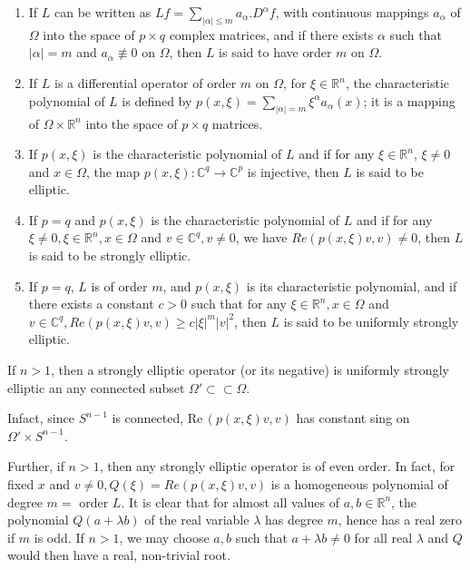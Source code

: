 \begin{defi*} %
  \begin{enumerate} [ (1)]
  \item If $L$ can be written as $Lf = \sum\limits_{| \alpha | \le m}
    a_\alpha . D^\alpha f$, with continuous mappings $a_\alpha$ of
    $\Omega$ into the space of $p \times q$ complex matrices, and if
    there exists $\alpha$ such that $| \alpha | = m$ and $a_\alpha
    \nequiv 0$ on $\Omega$, then $L$ is said to have order $m$ on
    $\Omega$. 
  \item If $L$ is a differential operator of order $m$ on $\Omega$,
    for $\xi \in \mathbb{R}^n$, the characteristic polynomial of $L$ is
    defined by $p (x, \xi) = \sum\limits_{| \alpha | =m} \xi^\alpha
    a_\alpha (x)$; it is a mapping of $\Omega \times \mathbb{R}^n$
    into the space of $p \times q $ matrices. 
  \item If $p (x, \xi)$ is the characteristic polynomial of $L$ and if
    for any $\xi \in \mathbb{R}^n$, $\xi \neq 0$ and $x \in \Omega$,
    the  map $p(x, \xi) : \mathbb{C}^q \to \mathbb{C}^p$ is injective,
    then $L$ is said to be elliptic. 
  \item If $p = q$ and $p(x, \xi)$ is the characteristic polynomial of
    $L$ and if for any $\xi \neq 0, \xi \in \mathbb{R}^n, x \in \Omega$
    and $v \in \mathbb{C}^q, v \neq 0$, we have $Re (p (x, \xi ) v, v)
    \neq 0$, then $L$ is said to be strongly elliptic. 
  \item If $p = q$, $L$ is of order $m$, and $p (x, \xi)$ is its
    characteristic polynomial, and if there exists a constant $c> 0$
    such that for any $\xi \in \mathbb{R}^n, x \in \Omega$ and $v \in
    \mathbb{C}^q, Re (p (x, \xi) v, v) \ge c | \xi |^m | v |^2$, then
    $L$ is said to be uniformly strongly elliptic. 
  \end{enumerate}
\end{defi*}

If $n > 1$, then a strongly elliptic operator (or its negative) is
uniformly strongly elliptic an any connected subset $\Omega' \subset
\subset \Omega$. 

In\pageoriginale fact, since $S^{n-1}$ is connected, Re\,$(p(x, \xi) v, v)$ has
constant sing on $\Omega' \times S^{n-1}$. 

Further, if $n > 1$, then any strongly elliptic operator is of even
order. In fact, for fixed $x$ and $v \neq 0, Q (\xi) = Re (p (x, \xi)
v, v)$ is a homogeneous polynomial of degree $m = $ order $L$. It is
clear that for almost all values of $a, b \in \mathbb{R}^n$, the
polynomial $Q(a+ \lambda b)$ of the real variable $\lambda$ has degree
$m$, hence has a real zero if $m$ is odd. If $n > 1$, we may choose
$a, b$ such that $a+ \lambda b \neq 0$ for all real $\lambda$ and $Q$
would then have a real, non-trivial root. 

